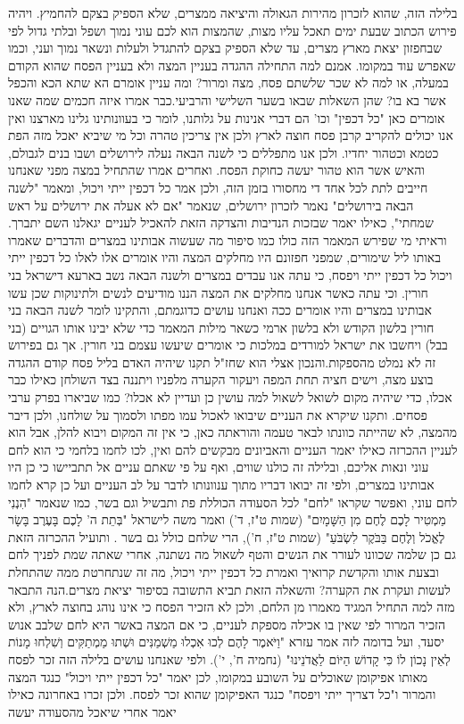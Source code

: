 \documentclass[12pt, openany]{book}
\begin{document}
בלילה הזה, שהוא לזכרון מהירות הגאולה והיציאה ממצרים, שלא הספיק בצקם להחמיץ. ויהיה פירוש הכתוב שבעת ימים תאכל עליו מצות, שהמצות הוא לכם עוני נמוך ושפל ובלתי גדול לפי שבחפזון יצאת מארץ מצרים, עד שלא הספיק בצקם להתגדל ולעלות ונשאר נמוך ועני, וכמו שאפרש עוד במקומו. אמנם למה התחילה ההגדה בעניין המצה ולא בעניין הפסח שהוא הקודם במעלה, או למה לא שכר שלשתם פסח, מצה ומרור? ומה עניין אומרם הא שתא הכא והכפל אשר בא בו? שהן השאלות שבאו בשער השלישי והרביעי.כבר אמרו איזה חכמים שמה שאנו אומרים כאן "כל דכפין" וכו' הם דברי אנינות על גלותנו, לומר כי בעוונותינו גלינו מארצנו ואין אנו יכולים להקריב קרבן פסח חוצה לארץ ולכן אין צריכין טהרה וכל מי שיביא יאכל מזה הפת כטמא וכטהור יחדיו. ולכן אנו מתפללים כי לשנה הבאה נעלה לירושלים ושבו בנים לגבולם, והאיש אשר הוא טהור יעשה כחוקת הפסח. ואחרים אמרו שהתחיל במצה מפני שאנחנו חייבים לתת לכל אחד די מחסורו בזמן הזה, ולכן אמר כל דכפין ייתי ויכול, ומאמר "לשנה הבאה בירושלים" נאמר לזכרון ירושלים, שנאמר "אם לא אעלה את ירושלים על ראש שמחתי", כאילו יאמר שבזכות הנדיבות והצדקה הזאת להאכיל לעניים יגאלנו השם יתברך. וראיתי מי שפירש המאמר הזה כולו כמו סיפור מה שעשוה אבותינו במצרים והדברים שאמרו באותו ליל שימורים, שמפני חפזונם היו מחלקים המצה והיו אומרים אלו לאלו כל דכפין ייתי ויכול כל דכפין ייתי ויפסח, כי עתה אנו עבדים במצרים ולשנה הבאה נשב בארעא דישראל בני חורין. וכי עתה כאשר אנחנו מחלקים את המצה הננו מודיעים לנשים ולתינוקות שכן עשו אבותינו במצרים והיו אומרים ככה ואנחנו עושים כדוגמתם, והתקינו לומר לשנה הבאה בני חורין בלשון הקודש ולא בלשון ארמי כשאר מילות המאמר כדי שלא יבינו אותו הגויים (בני בבל) ויחשבו את ישראל למורדים במלכות כי אומרים שיעשו עצמם בני חורין. אך גם בפירוש זה לא נמלט מהספקות.והנכון אצלי הוא שחז"ל תקנו שיהיה האדם בליל פסח קודם ההגדה בוצע מצה, וישים חציה תחת המפה ויעקור הקערה מלפניו ויתננה בצד השולחן כאילו כבר אכלו, כדי שיהיה מקום לשואל לשאול למה עושין כן ועדיין לא אכלו? כמו שביארו בפרק ערבי פסחים. ותקנו שיקרא את העניים שיבואו לאכול עמו מפתו ולסמוך על שולחנו, ולכן דיבר מהמצה, לא שהייתה כוונתו לבאר טעמה והוראתה כאן, כי אין זה המקום ויבוא להלן, אבל הוא לעניין ההכרזה כאילו יאמר העניים והאביונים מבקשים להם ואין, לכו לחמו בלחמי כי הוא לחם עוני ונאות אליכם, ובלילה זה כולנו שווים, ואף על פי שאתם עניים אל תתביישו כי כן היו אבותינו במצרים, ולפי זה יבואו דבריו מתוך ענוונותו לדבר על לב העניים ועל כן קרא לחמו לחם עוני, ואפשר שקראו "לחם" לכל הסעודה הכוללת פת ותבשיל וגם בשר, כמו שנאמר "הִנְנִי מַמְטִיר לָכֶם לֶחֶם מִן הַשָּׁמָיִם" (שמות ט"ז, ד') ואמר משה לישראל "בְּתֵת ה' לָכֶם בָּעֶרֶב בָּשָׂר לֶאֱכֹל וְלֶחֶם בַּבֹּקֶר לִשְׂבֹּעַ" (שמות ט"ז, ח'), הרי שלחם כולל גם בשר . ותועיל ההכרזה הזאת גם כן שלמה שכוונו לעורר את הנשים והטף לשאול מה נשתנה, אחרי שאתה שמת לפניך לחם ובצעת אותו והקדשת קרואיך ואמרת כל דכפין ייתי ויכול, מה זה שנתחרטת ממה שהתחלת לעשות ועקרת את הקערה? והשאלה הזאת תביא התשובה בסיפור יציאת מצרים.הנה התבאר מזה למה התחיל המגיד מאמרו מן הלחם, ולכן לא הזכיר הפסח כי אינו נוהג בחוצה לארץ, ולא הזכיר המרור לפי שאין בו אכילה מספקת לעניים, כי אם המצה באשר היא לחם שלבב אנוש יסעד, ועל בדומה לזה אמר עזרא "וַיֹּאמֶר לָהֶם לְכוּ אִכְלוּ מַשְׁמַנִּים וּשְׁתוּ מַמְתַקִּים וְשִׁלְחוּ מָנוֹת לְאֵין נָכוֹן לוֹ כִּי קָדוֹשׁ הַיּוֹם לַאֲדֹנֵינוּ" (נחמיה ח', י'). ולפי שאנחנו עושים בלילה הזה זכר לפסח מאותו אפיקומן שאוכלים על השובע במקומו, לכן יאמר "כל דכפין ייתי ויכול" כנגד המצה והמרור ו"כל דצריך ייתי ויפסח" כנגד האפיקומן שהוא זכר לפסח. ולכן זכרו באחרונה כאילו יאמר אחרי שיאכל מהסעודה יעשה 
\end{document}
